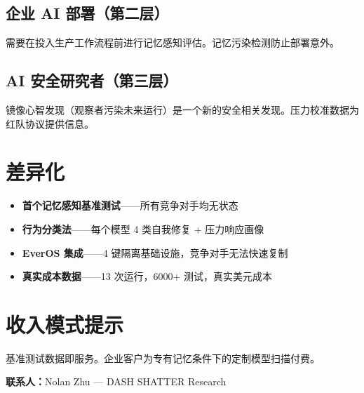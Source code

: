 \documentclass[11pt,a4paper]{article}
\begin{document}
\subsection*{企业 AI 部署（第二层）}
需要在投入生产工作流程前进行记忆感知评估。记忆污染检测防止部署意外。

\subsection*{AI 安全研究者（第三层）}
镜像心智发现（观察者污染未来运行）是一个新的安全相关发现。压力校准数据为红队协议提供信息。

\section{差异化}

\begin{itemize}
  \item \textbf{首个记忆感知基准测试}——所有竞争对手均无状态
  \item \textbf{行为分类法}——每个模型 4 类自我修复 + 压力响应画像
  \item \textbf{EverOS 集成}——4 键隔离基础设施，竞争对手无法快速复制
  \item \textbf{真实成本数据}——13 次运行，6000+ 测试，真实美元成本
\end{itemize}

\section{收入模式提示}

基准测试数据即服务。企业客户为专有记忆条件下的定制模型扫描付费。

\vfill
\textbf{联系人：}Nolan Zhu — DASH SHATTER Research
\end{document}

